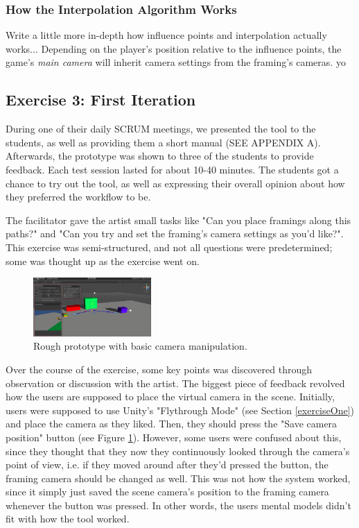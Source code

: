 \subsubsection{How the Interpolation Algorithm Works}
Write a little more in-depth how influence points and interpolation actually works...
Depending on the player's position relative to the influence points, the game's \textit{main camera} will inherit camera settings from the framing's cameras.
yo




\subsection{Exercise 3: First Iteration}
During one of their daily SCRUM meetings, we presented the tool to the students, as well as providing them a short manual (SEE APPENDIX A). Afterwards, the prototype was shown to three of the students to provide feedback. Each test session lasted for about 10-40 minutes. The students got a chance to try out the tool, as well as expressing their overall opinion about how they preferred the workflow to be.

The facilitator gave the artist small tasks like "Can you place framings along this paths?" and "Can you try and set the framing's camera settings as you'd like?". This exercise was semi-structured, and not all questions were predetermined; some was thought up as the exercise went on.

\begin{figure}[htbp]
\centering
\includegraphics[width=0.40\textwidth]{Pics/MainSetup}
\caption{Rough prototype with basic camera manipulation.}
\label{fig:prototype}
\end{figure}

Over the course of the exercise, some key points was discovered through observation or discussion with the artist. The biggest piece of feedback revolved how the users are supposed to place the virtual camera in the scene. Initially, users were supposed to use Unity's "Flythrough Mode" (see Section \ref{exerciseOne}) and place the camera as they liked. Then, they should press the "Save camera position" button (see Figure \ref{fig:prototype}). However, some users were confused about this, since they thought that they now they continuously looked through the camera's point of view, i.e. if they moved around after they'd pressed the button, the framing camera should be changed as well. This was not how the system worked, since it simply just saved the scene camera's position to the framing camera whenever the button was pressed. In other words, the users mental models didn't fit with how the tool worked.
